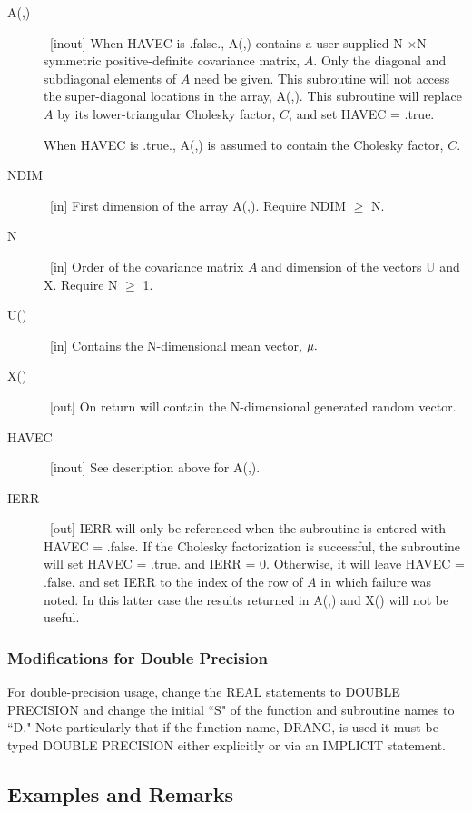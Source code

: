 \documentclass[twoside]{MATH77}
\begin{document}
\begin{description}
\item[A(,)]  \ [inout] When HAVEC is .false., A(,) contains a user-supplied N%
$\times $N symmetric positive-definite covariance matrix, $A$. Only the
diagonal and subdiagonal elements of $A$ need be given. This subroutine will
not access the super-diagonal locations in the array, A(,). This subroutine
will replace $A$ by its lower-triangular Cholesky factor, $C$, and set HAVEC
= .true.

When HAVEC is .true., A(,) is assumed to contain the Cholesky factor, $C$.

\item[NDIM]  \ [in] First dimension of the array A(,). Require NDIM $\geq $
N.

\item[N]  \ [in] Order of the covariance matrix $A$ and dimension of the
vectors U and X.  Require N $\geq $ 1.

\item[U()]  \ [in] Contains the N-dimensional mean vector, ${\bf \mu }.$

\item[X()]  \ [out] On return will contain the N-dimensional generated
random vector.

\item[HAVEC]  \ [inout] See description above for A(,).

\item[IERR]  \ [out] IERR will only be referenced when the subroutine is
entered with HAVEC = .false. If the Cholesky factorization is successful,
the subroutine will set HAVEC = .true. and IERR = 0. Otherwise, it will
leave HAVEC = .false. and set IERR to the index of the row of $A$ in which
failure was noted. In this latter case the results returned in A(,) and X()
will not be useful.
\end{description}

\subsubsection{Modifications for Double Precision}

For double-precision usage, change the REAL statements to DOUBLE PRECISION
and change the initial ``S" of the function and subroutine names to ``D."
Note particularly that if the function name, DRANG, is used it must be typed
DOUBLE PRECISION either explicitly or via an IMPLICIT statement.

\subsection{Examples and Remarks}
\end{document}
